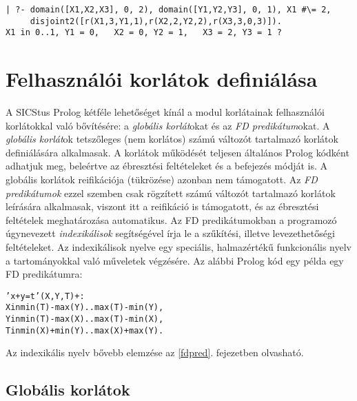 \begin{verbatim}
| ?- domain([X1,X2,X3], 0, 2), domain([Y1,Y2,Y3], 0, 1), X1 #\= 2,
     disjoint2([r(X1,3,Y1,1),r(X2,2,Y2,2),r(X3,3,0,3)]).
X1 in 0..1, Y1 = 0,   X2 = 0, Y2 = 1,   X3 = 2, Y3 = 1 ?
\end{verbatim}

\section{Felhasználói korlátok definiálása}

A SICStus Prolog kétféle lehetőséget kínál a \clpfd modul korlátainak
felhasználói korlátokkal való bővítésére: a \emph{globális korlát}okat és
az \emph{FD predikátum}okat. A \emph{globális korlát}ok tetszőleges (nem korlátos)
számú változót tartalmazó korlátok definiálására alkalmasak. A korlátok
működését teljesen általános Prolog kódként adhatjuk meg, beleértve az
ébresztési feltételeket és a befejezés módját is. A globális korlátok
reifikációja (tükrözése) azonban nem támogatott. Az \emph{FD predikátumok}
ezzel szemben csak rögzített számú változót tartalmazó korlátok leírására
alkalmasak, viszont itt a reifikáció is támogatott, és az ébresztési
feltételek meghatározása automatikus. Az FD predikátumokban a programozó
úgynevezett \emph{indexikálisok} segítségével írja le a szűkítési, illetve
levezethetőségi feltételeket. Az indexikálisok nyelve egy speciális, halmazértékű
funkcionális nyelv a tartományokkal való műveletek végzésére. Az alábbi
Prolog kód egy példa egy FD predikátumra:

\begin{alltt}
% Az X+Y #= T korlát (intervallum szűkítéssel)
'x+y=t'(X,Y,T) +:  
        X in min(T) - max(Y)..max(T) - min(Y),
        Y in min(T) - max(X)..max(T) - min(X),
        T in min(X) + min(Y)..max(X) + max(Y).
\end{alltt}

Az indexikális nyelv bővebb elemzése az \ref{fdpred}. fejezetben olvasható.

\subsection{Globális korlátok}

\label{globalis}


